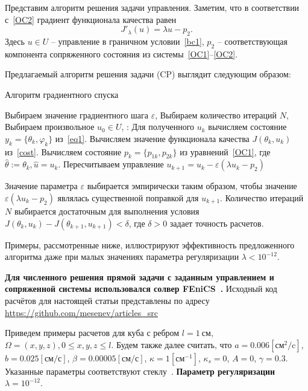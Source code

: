 \documentclass[12pt]{article}
\begin{document}
    Представим алгоритм решения задачи управления.
    Заметим, что в соответствии с~\eqref{OC2} градиент функционала качества равен
    \[
        J'_\lambda (u) = \lambda u - p_2.
    \]
    Здесь $u\in U$ -- управление в граничном условии~\eqref{bc1}, $p_2$ -- соответствующая компонента
    сопряженного состояния из системы~\eqref{OC1}--\eqref{OC2}.

    Предлагаемый алгоритм решения задачи (CP) выглядит следующим образом:
    \begin{algorithm}[H]
        \caption{Алгоритм градиентного спуска}
        \begin{algorithmic}[1]
            \State Выбираем значение градиентного шага $\varepsilon$,
            \State Выбираем количество итераций $N$,
            \State Выбираем произвольное $u_0 \in U$,
            :
            \State Для полученного $u_k$ вычисляем состояние $y_k = \{\theta_k, \varphi_k\}$ из~\eqref{eq1}.
            \State Вычисляем значение функционала качества $J(\theta_k, u_k)$ из~\eqref{cost}.
            \State Вычисляем состояние $p_k=\{p_{1k},p_{2k}\}$ из уравнений~\eqref{OC1},
            где $ \hat{\theta} := \theta_k, \hat{u}=u_k$.
            \State Пересчитываем управление $u_{k+1} = u_k - \varepsilon (\lambda u_k - p_2)$
            \EndFor
        \end{algorithmic}\label{alg:algorithm}
    \end{algorithm}
    Значение параметра $\varepsilon$ выбирается эмпирически таким образом, чтобы значение
    $\varepsilon (\lambda u_k - p_2)$ являлась существенной поправкой для $u_{k+1}$.
    Количество итераций $N$ выбирается достаточным для выполнения условия
    $J(\theta_k, u_k) - J(\theta_{k+1}, u_{k+1}) < \delta$, где $\delta>0$ задает точность расчетов.

    Примеры, рассмотренные ниже, иллюстрируют эффективность предложенного алгоритма даже при
    малых значениях параметра регуляризации $\lambda < 10^{-12}.$

    \textbf{Для численного решения прямой задачи с заданным управлением и сопряженной системы
    использовался солвер FEniCS~\cite{fenics, dolfin}.}
    Исходный код расчётов для настоящей статьи представлены по адресу \url{https://github.com/mesenev/articles_src}


    Приведем примеры расчетов для куба с ребром $l=1~\text{см}$,
    $\Omega = {(x, y, z), 0 \leq x,y,z \leq l}$.
    Будем также далее считать, что $a = 0.006[\text{см}^2/\text{c}]$,
    $b=0.025[\text{см}/\text{с}]$, $\beta = 0.00005[\text{см}/\text{с}]$,
    $\kappa=1[\text{см}^{-1}]$, $\kappa_s = 0$, $A = 0$, $\gamma = 0.3$.
    Указанные параметры соответствуют стеклу~\cite{Grenkin5}. \textbf{Параметр регуляризации $\lambda=10^{-12}.$}
\end{document}
